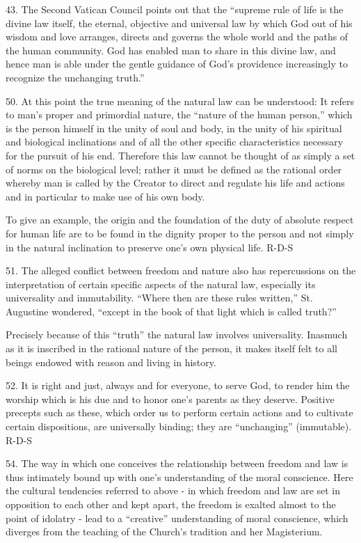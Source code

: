 \documentclass[oneside]{book}
\begin{document}
43. The Second Vatican Council points out that the ``supreme rule of life is the
divine law itself, the eternal, objective and universal law by which God out of
his wisdom and love arranges, directs and governs the whole world and the paths
of the human community. God has enabled man to share in this divine law, and
hence man is able under the gentle guidance of God's providence increasingly to
recognize the unchanging truth.''

50. At this point the true meaning of the natural law can be understood: It
refers to man's proper and primordial nature, the ``nature of the human
person,'' which is the person himself in the unity of soul and body, in the
unity of his spiritual and biological inclinations and of all the other specific
characteristics necessary for the pursuit of his end. Therefore this law cannot
be thought of as simply a set of norms on the biological level; rather it must
be defined as the rational order whereby man is called by the Creator to direct
and regulate his life and actions and in particular to make use of his own body.

To give an example, the origin and the foundation of the duty of absolute
respect for human life are to be found in the dignity proper to the person and
not simply in the natural inclination to preserve one's own physical life.
R-D-S

51. The alleged conflict between freedom and nature also has repercussions on
the interpretation of certain specific aspects of the natural law, especially
its universality and immutability. ``Where then are these rules written,''
St. Augustine wondered, ``except in the book of that light which is called
truth?''

Precisely because of this ``truth'' the natural law involves
universality. Inasmuch as it is inscribed in the rational nature of the person,
it makes itself felt to all beings endowed with reason and living in history.

52. It is right and just, always and for everyone, to serve God, to render him
the worship which is his due and to honor one's parents as they
deserve. Positive precepts such as these, which order us to perform certain
actions and to cultivate certain dispositions, are universally binding; they are
``unchanging'' (immutable).
R-D-S

54. The way in which one conceives the relationship between freedom and law is
thus intimately bound up with one's understanding of the moral conscience. Here
the cultural tendencies referred to above - in which freedom and law are set in
opposition to each other and kept apart, the freedom is exalted almost to the
point of idolatry - lead to a ``creative'' understanding of moral conscience,
which diverges from the teaching of the Church's tradition and her Magisterium.
\end{document}
